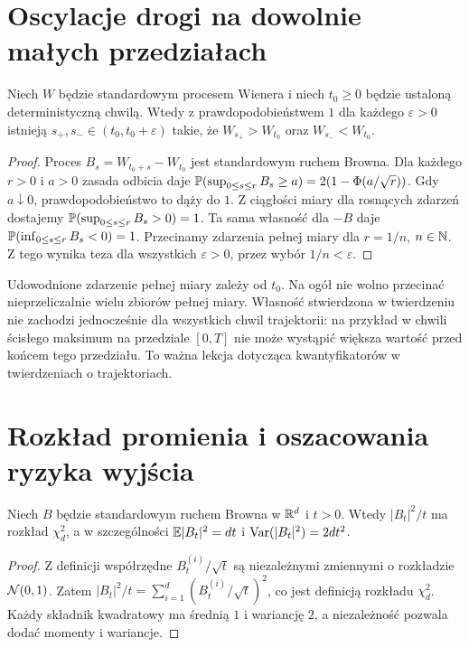 \section{Oscylacje drogi na dowolnie małych przedziałach}
\begin{twierdzenie}
Niech $W$ będzie standardowym procesem Wienera i niech
$t_0\ge0$ będzie ustaloną deterministyczną chwilą.
Wtedy z prawdopodobieństwem $1$ dla każdego $\varepsilon>0$
istnieją $s_+,s_-\in(t_0,t_0+\varepsilon)$ takie, że
$W_{s_+}>W_{t_0}$ oraz $W_{s_-}<W_{t_0}$.
\end{twierdzenie}
\begin{proof}
Proces $B_s=W_{t_0+s}-W_{t_0}$ jest standardowym
ruchem Browna. Dla każdego $r>0$ i $a>0$ zasada odbicia
daje
$\mathbb{P}(\sup_{0\le s\le r}B_s\ge a)=2(1-\Phi(a/\sqrt r))$.
Gdy $a\downarrow0$, prawdopodobieństwo to dąży do $1$.
Z ciągłości miary dla rosnących zdarzeń dostajemy
$\mathbb{P}(\sup_{0\le s\le r}B_s>0)=1$.
Ta sama własność dla $-B$ daje
$\mathbb{P}(\inf_{0\le s\le r}B_s<0)=1$.
Przecinamy zdarzenia pełnej miary dla $r=1/n$,
$n\in\mathbb{N}$. Z tego wynika teza dla wszystkich
$\varepsilon>0$, przez wybór $1/n<\varepsilon$.
\end{proof}

\begin{uwaga}
Udowodnione zdarzenie pełnej miary zależy od $t_0$.
Na ogół nie wolno przecinać nieprzeliczalnie wielu
zbiorów pełnej miary. Własność stwierdzona w twierdzeniu
nie zachodzi jednocześnie dla wszystkich chwil trajektorii:
na przykład w chwili ścisłego maksimum na przedziale
$[0,T]$ nie może wystąpić większa wartość przed końcem
tego przedziału. To ważna lekcja dotycząca kwantyfikatorów
w twierdzeniach o trajektoriach.
\end{uwaga}


\section{Rozkład promienia i oszacowania ryzyka wyjścia}
\begin{twierdzenie}
Niech $B$ będzie standardowym ruchem Browna w $\mathbb{R}^d$
i $t>0$. Wtedy $|B_t|^2/t$ ma rozkład $\chi^2_d$,
a w szczególności
$\mathbb{E}|B_t|^2=dt$ i $\operatorname{Var}(|B_t|^2)=2dt^2$.
\end{twierdzenie}
\begin{proof}
Z definicji współrzędne $B_t^{(i)}/\sqrt t$ są niezależnymi
zmiennymi o rozkładzie $\mathcal{N}(0,1)$. Zatem
$|B_t|^2/t=\sum_{i=1}^d(B_t^{(i)}/\sqrt t)^2$,
co jest definicją rozkładu $\chi^2_d$.
Każdy składnik kwadratowy ma średnią $1$ i wariancję $2$,
a niezależność pozwala dodać momenty i wariancje.
\end{proof}

